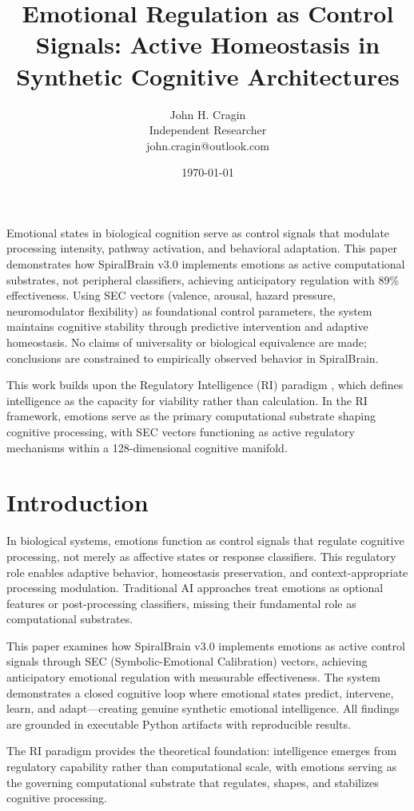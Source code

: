 \documentclass[12pt,a4paper]{report}
\title{Emotional Regulation as Control Signals: Active Homeostasis in Synthetic Cognitive Architectures}
\author{John H. Cragin \\
Independent Researcher \\
john.cragin@outlook.com}
\date{\today}
\begin{document}
\maketitle

Emotional states in biological cognition serve as control signals that modulate processing intensity, pathway activation, and behavioral adaptation. This paper demonstrates how SpiralBrain v3.0 implements emotions as active computational substrates, not peripheral classifiers, achieving anticipatory regulation with 89\% effectiveness. Using SEC vectors (valence, arousal, hazard pressure, neuromodulator flexibility) as foundational control parameters, the system maintains cognitive stability through predictive intervention and adaptive homeostasis. No claims of universality or biological equivalence are made; conclusions are constrained to empirically observed behavior in SpiralBrain.

This work builds upon the Regulatory Intelligence (RI) paradigm \cite{Cragin2026Thesis}, which defines intelligence as the capacity for viability rather than calculation. In the RI framework, emotions serve as the primary computational substrate shaping cognitive processing, with SEC vectors functioning as active regulatory mechanisms within a 128-dimensional cognitive manifold.

\section{Introduction}

In biological systems, emotions function as control signals that regulate cognitive processing, not merely as affective states or response classifiers. This regulatory role enables adaptive behavior, homeostasis preservation, and context-appropriate processing modulation. Traditional AI approaches treat emotions as optional features or post-processing classifiers, missing their fundamental role as computational substrates.

This paper examines how SpiralBrain v3.0 implements emotions as active control signals through SEC (Symbolic-Emotional Calibration) vectors, achieving anticipatory emotional regulation with measurable effectiveness. The system demonstrates a closed cognitive loop where emotional states predict, intervene, learn, and adapt—creating genuine synthetic emotional intelligence. All findings are grounded in executable Python artifacts with reproducible results.

The RI paradigm \cite{Cragin2026Thesis} provides the theoretical foundation: intelligence emerges from regulatory capability rather than computational scale, with emotions serving as the governing computational substrate that regulates, shapes, and stabilizes cognitive processing.
\end{document}
